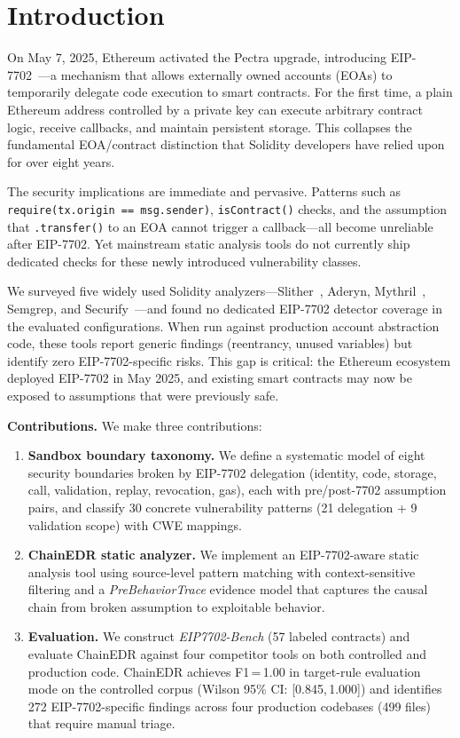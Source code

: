 \section{Introduction}
\label{sec:introduction}

On May 7, 2025, Ethereum activated the Pectra upgrade, introducing EIP-7702~\cite{eip7702}---a mechanism that allows externally owned accounts (EOAs) to temporarily delegate code execution to smart contracts. For the first time, a plain Ethereum address controlled by a private key can execute arbitrary contract logic, receive callbacks, and maintain persistent storage. This collapses the fundamental EOA/contract distinction that Solidity developers have relied upon for over eight years.

The security implications are immediate and pervasive. Patterns such as \texttt{require(tx.origin == msg.sender)}, \texttt{isContract()} checks, and the assumption that \texttt{.transfer()} to an EOA cannot trigger a callback---all become unreliable after EIP-7702. Yet mainstream static analysis tools do not currently ship dedicated checks for these newly introduced vulnerability classes.

We surveyed five widely used Solidity analyzers---Slither~\cite{slither}, Aderyn, Mythril~\cite{mythril}, Semgrep, and Securify~\cite{securify}---and found no dedicated EIP-7702 detector coverage in the evaluated configurations. When run against production account abstraction code, these tools report generic findings (reentrancy, unused variables) but identify zero EIP-7702-specific risks. This gap is critical: the Ethereum ecosystem deployed EIP-7702 in May 2025, and existing smart contracts may now be exposed to assumptions that were previously safe.

\textbf{Contributions.} We make three contributions:

\begin{enumerate}
    \item \textbf{Sandbox boundary taxonomy.} We define a systematic model of eight security boundaries broken by EIP-7702 delegation (identity, code, storage, call, validation, replay, revocation, gas), each with pre/post-7702 assumption pairs, and classify 30 concrete vulnerability patterns (21 delegation + 9 validation scope) with CWE mappings.

    \item \textbf{ChainEDR static analyzer.} We implement an EIP-7702-aware static analysis tool using source-level pattern matching with context-sensitive filtering and a \textit{PreBehaviorTrace} evidence model that captures the causal chain from broken assumption to exploitable behavior.

    \item \textbf{Evaluation.} We construct \textit{EIP7702-Bench} (57 labeled contracts) and evaluate ChainEDR against four competitor tools on both controlled and production code. ChainEDR achieves F1\,=\,1.00 in target-rule evaluation mode on the controlled corpus (Wilson 95\% CI: [0.845,\,1.000]) and identifies 272 EIP-7702-specific findings across four production codebases (499 files) that require manual triage.
\end{enumerate}

